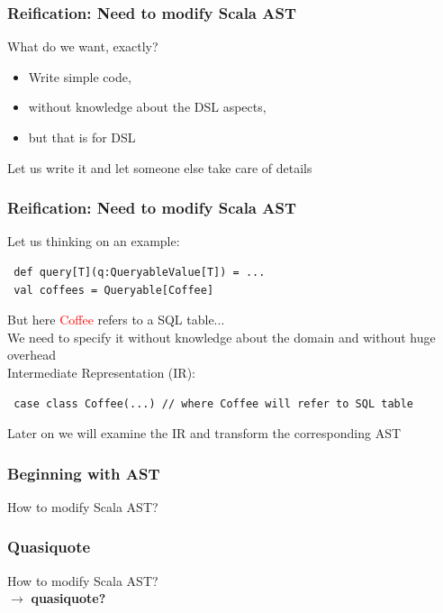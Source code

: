 \documentclass{beamer}
\newcommand{\TCR}{\textcolor{red}}
\begin{document}


\begin{frame}[fragile]
\frametitle{Reification: Need to modify Scala AST}

What do we want, exactly?
\begin{itemize}
\item Write simple code, 
\item without knowledge about the DSL aspects,
\item but that is for DSL
\end{itemize}

Let us write it and let someone else take care of details


\end{frame}



\begin{frame}[fragile]
\frametitle{Reification: Need to modify Scala AST}

Let us thinking on an example:
\begin{lstlisting}
 def query[T](q:QueryableValue[T]) = ...
 val coffees = Queryable[Coffee]
 \end{lstlisting}
 
But here \TCR{Coffee} refers to a SQL table...\\
We need to specify it without knowledge about the domain and without huge overhead\\
Intermediate Representation (IR):\\

\begin{lstlisting}
 case class Coffee(...) // where Coffee will refer to SQL table
\end{lstlisting}
 Later on we will examine the IR and transform the corresponding AST

\end{frame}


\begin{frame}
\frametitle{Beginning with AST}

How to modify Scala AST?\\

\end{frame}


\begin{frame}
\frametitle{Quasiquote}

How to modify Scala AST?\\
$\rightarrow $ \textbf{quasiquote?}\\

\end{frame}
\end{document}
